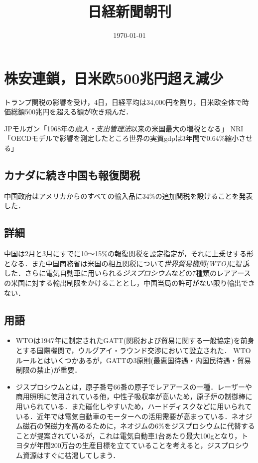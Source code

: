 \documentclass{ltjsarticle}
\title{日経新聞朝刊}
\author{}
\date{\today}
\begin{document}
\maketitle

\section{株安連鎖，日米欧500兆円超え減少}

トランプ関税の影響を受け，4日，日経平均は34,000円を割り，日米欧全体で時価総額500兆円を超える額が吹き飛んだ．

JPモルガン「1968年の\emph{歳入・支出管理法}以来の米国最大の増税となる」
NRI「OECDモデルで影響を測定したところ世界の実質gdpは3年間で0.64\%縮小させる」


\subsection{カナダに続き中国も報復関税}

中国政府はアメリカからのすべての輸入品に34\%の追加関税を設けることを発表した．

\subsection{詳細}

中国は2月と3月にすでに10～15\%の報復関税を設定指定が，それに上乗せする形となる．また中国商務省は米国の相互関税について\emph{世界貿易機関(WTO)}に提訴した．さらに電気自動車に用いられる\emph{ジスプロシウム}などの7種類のレアアースの米国に対する輸出制限をかけることとし，中国当局の許可がない限り輸出できない．

\subsection{用語}

\begin{itemize}
  \item WTOは1947年に制定されたGATT(関税および貿易に関する一般協定)を前身とする国際機関で，ウルグアイ・ラウンド交渉において設立された．
  WTOルールとはいくつかあるが，GATTの3原則(最恵国待遇・内国民待遇・貿易制限の禁止)が重要．

  \item ジスプロシウムとは，原子番号66番の原子でレアアースの一種．レーザーや商用照明に使用されている他，中性子吸収率が高いため，原子炉の制御棒に用いられている．また磁化しやすいため，ハードディスクなどに用いられている．近年では電気自動車のモーターへの活用需要が高まっている．ネオジム磁石の保磁力を高めるために，ネオジムの6\%をジスプロシウムに代替することが提案されているが，これは電気自動車1台あたり最大100gとなり，トヨタが年間200万台の生産目標を立てていることを考えると，ジスプロシウム資源はすぐに枯渇してしまう．
\end{itemize}
\end{document}

